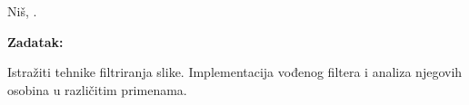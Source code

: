 \documentclass[a4paper,12pt,titlepage]{article}
\begin{document}
\begin{titlepage}
    \vspace{1cm}
   
    
    
        
   
  
    
    
     \begin{center}
        Niš, \the\year.
    \end{center}
\end{titlepage}

\vspace{2cm}

   \noindent
    \textbf{Zadatak:}
    
   \vspace{0.2cm}

 \noindent
  Istražiti tehnike filtriranja slike. Implementacija vođenog filtera i analiza njegovih osobina u različitim primenama.
  
\vspace{20cm}
\end{document}
